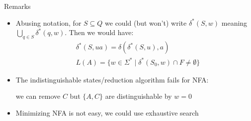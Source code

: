 \documentclass[handout]{beamer}
\begin{document}
\begin{frame}{Remarks}

    \begin{itemize}
        \item Abusing notation, for $S\subseteq Q$ we could (but won't) write $\delta^*(S,w)$ meaning $\bigcup_{q\in S}\delta^*(q,w)$. Then we would have:
        \begin{align*}
            &\delta^*(S,ua)=\delta(\delta^*(S,u),a) \\
            &L(A)=\{w\in\Sigma^*\mid\delta^*(S_0,w)\cap F\neq\emptyset\}
        \end{align*}
        
        \item The indistinguishable states/reduction algorithm fails for NFA:
        
        \begin{minipage}{0.35\linewidth}
        \end{minipage}
        \begin{minipage}{0.55\linewidth}
            we can remove $C$ but $\{A,C\}$ are distinguishable by $w=0$
        \end{minipage}
        
        \medskip
        \item Minimizing NFA is not easy, we could use exhaustive search        
    \end{itemize}

\end{frame}
\end{document}
